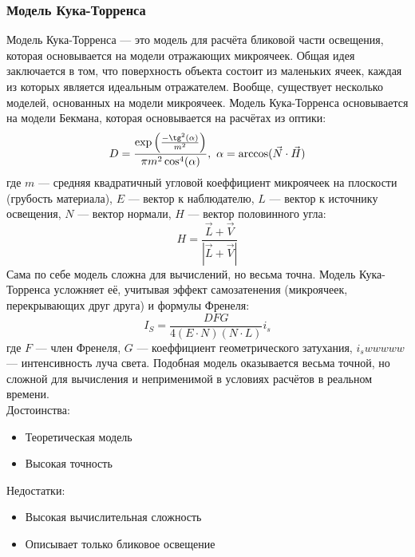 \documentclass[a4paper,12pt]{report}
\numberwithin{equation}{section}
\begin{document}
\subsubsection*{Модель Кука-Торренса}
Модель Кука-Торренса --- это модель для расчёта бликовой части освещения, которая основывается на модели отражающих микроячеек. Общая идея заключается в том, что поверхность объекта состоит из маленьких ячеек, каждая из которых является идеальным отражателем. Вообще, существует несколько моделей, основанных на модели микроячеек. Модель Кука-Торренса основывается на модели Бекмана, которая основывается на расчётах из оптики:
\begin{equation}
D = \frac{\exp \left( \frac{-\tg^2(\alpha)}{m^2} \right)}{\pi m^2 \cos^4(\alpha)}, ~ \alpha = \arccos(\vec{N} \cdot \vec{H})
\end{equation}
где $m$ --- средняя квадратичный угловой коеффициент микроячеек на плоскости (грубость материала), $E$ --- вектор к наблюдателю, $L$ --- вектор к источнику освещения, $N$ --- вектор нормали, $H$ --- вектор половинного угла:
\begin{equation}
H = \frac{\vec{L} + \vec{V}}{|\vec{L} + \vec{V}|} \label{halfway_vec}
\end{equation}
Сама по себе модель сложна для вычислений, но весьма точна. Модель Кука-Торренса усложняет её, учитывая эффект самозатенения (микроячеек, перекрывающих друг друга) и формулы Френеля:
\begin{equation}
I_S = \frac{D F G}{4(E \cdot N)(N\cdot L)} i_s
\end{equation}
где $F$ --- член Френеля, $G$ --- коеффициент геометрического затухания, $i_swwwww$ --- интенсивность луча света. Подобная модель оказывается весьма точной, но сложной для вычисления и неприменимой в условиях расчётов в реальном времени. \\
Достоинства:
\begin{itemize}
\item Теоретическая модель
\item Высокая точность
\end{itemize}
Недостатки:
\begin{itemize}
\item Высокая вычислительная сложность
\item Описывает только бликовое освещение
\end{itemize}
\end{document}
